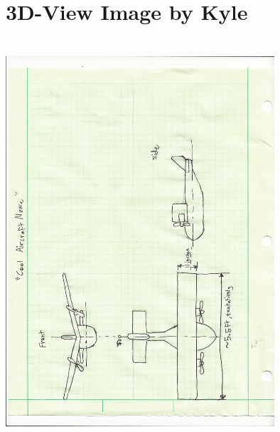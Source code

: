 \documentclass[footheight=20pt, footsepline, headheight=20pt, headsepline]{scrartcl}
\begin{document}
\section{3D-View Image by Kyle}
\centering
\includegraphics[width=10cm, height=15cm, angle=270]{cool aircraft name.jpeg}
\newpage
\end{document}
